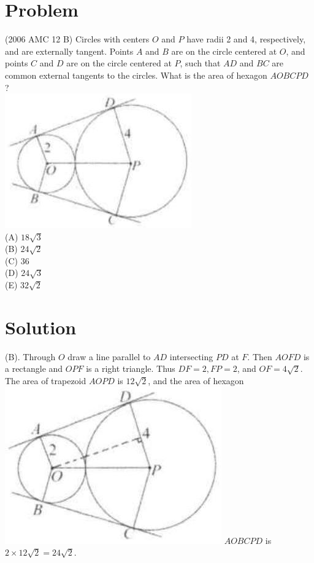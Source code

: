 \documentclass{article}
\begin{document}
\section*{Problem}
(2006 AMC 12 B) Circles with centers \(O\) and \(P\) have radii 2 and 4, respectively, and are externally tangent. Points \(A\) and \(B\) are on the circle centered at \(O\), and points \(C\) and \(D\) are on the circle centered at \(P\), such that \(A D\) and \(B C\) are common external tangents to the circles. What is the area of hexagon \(A O B C P D\) ?\\
\centering
\includegraphics[width=\textwidth]{images/184(3).jpg}\\
(A) \(18 \sqrt{3}\)\\
(B) \(24 \sqrt{2}\)\\
(C) 36\\
(D) \(24 \sqrt{3}\)\\
(E) \(32 \sqrt{2}\)

\section*{Solution}
(B).
Through \(O\) draw a line parallel to \(A D\) intersecting \(P D\) at \(F\). Then \(A O F D\) is a rectangle and \(O P F\) is a right triangle. Thus \(D F=2, F P=2\), and \(O F=4 \sqrt{2}\). The area of trapezoid \(A O P D\) is \(12 \sqrt{2}\), and the area of hexagon\\
\includegraphics[width=\textwidth]{images/187.jpg} \(A O B C P D\) is \(2 \times 12 \sqrt{2}=24 \sqrt{2}\).
\end{document}
